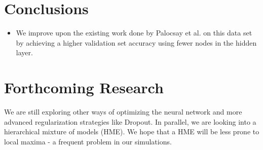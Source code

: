 \documentclass[a0,landscape]{a0poster}
\begin{document}
\begin{multicols}{4}

\color{SaddleBrown} %

\section*{Conclusions}

\begin{itemize}
\item We improve upon the existing work done by Palocsay et al. \cite{bib1} on this data set by achieving a higher validation set accuracy using fewer nodes in the hidden layer.
\end{itemize}

\color{DarkSlateGray} %


\section*{Forthcoming Research}

We are still exploring other ways of optimizing the neural network and more advanced regularization strategies like Dropout. In parallel, we are looking into a hierarchical mixture of models (HME). We hope that a HME will be less prone to local maxima - a frequent problem in our simulations.


\nocite{*}




\end{multicols}
\end{document}
